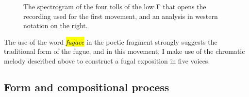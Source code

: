 \documentclass[12pt,twoside,maitrise]{dms_ks}
\theoremstyle{definition}
\begin{document}
{\begin{figure}[h]
    \centering
    \caption{The spectrogram of the four tolls of the low F that opens the recording used for the first movement, and an analysis in western notation on the right.}
    \label{fig:cloche_analyse}
\end{figure}

The use of the word \hl{\textit{fugace}} in the poetic fragment strongly suggests the traditional form of the fugue, and in this movement, I make use of the chromatic melody described above to construct a fugal exposition in five voices.

\subsection{Form and compositional process}

}
\end{document}
